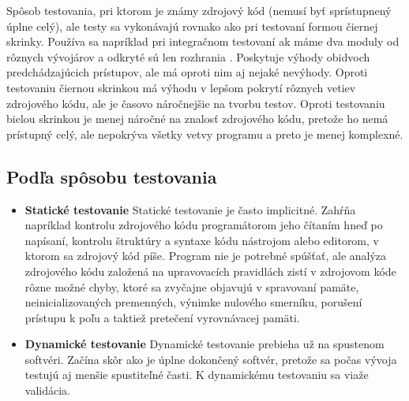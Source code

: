 \documentclass[11pt,twoside,slovak,a4paper]{article}
\begin{document}
\begin{itemize}
			Spôsob testovania, pri ktorom je známy zdrojový kód (nemusí byť sprístupnený úplne celý), ale testy sa vykonávajú rovnako ako pri testovaní formou čiernej skrinky. Používa sa napríklad pri integračnom testovaní ak máme dva moduly od rôznych vývojárov a odkryté sú len rozhrania \cite{EST2002}. Poskytuje výhody obidvoch predchádzajúcich prístupov, ale má oproti nim aj nejaké nevýhody. Oproti testovaniu čiernou skrinkou má výhodu v lepšom pokrytí rôznych vetiev zdrojového kódu, ale je časovo náročnejšie na tvorbu testov. Oproti testovaniu bielou skrinkou je menej náročné na znalosť zdrojového kódu, pretože ho nemá prístupný celý, ale nepokrýva všetky vetvy programu a preto je menej komplexné.
	\end{itemize}
	
	\subsection{Podľa spôsobu testovania}
	\begin{itemize}
		\item \textbf{Statické testovanie} \newline
			Statické testovanie je často implicitné. Zahŕňa napríklad kontrolu zdrojového kódu programátorom jeho čítaním hneď po napísaní, kontrolu štruktúry a syntaxe kódu nástrojom alebo editorom, v ktorom sa zdrojový kód píše. Program nie je potrebné spúšťať, ale analýza zdrojového kódu založená na upravovacích pravidlách zistí v zdrojovom kóde rôzne možné chyby, ktoré sa zvyčajne objavujú v spravovaní pamäte, neinicializovaných premenných, výnimke nulového smerníku, porušení prístupu k poľu a taktiež pretečení vyrovnávacej pamäti\cite{Wei2014}.
		\item \textbf{Dynamické testovanie} \newline
			Dynamické testovanie prebieha už na spustenom softvéri. Začína skôr ako je úplne dokončený softvér, pretože sa počas vývoja testujú aj menšie spustiteľné časti. K dynamickému testovaniu sa viaže validácia.
	\end{itemize}
	
\end{document}
